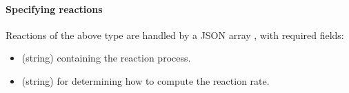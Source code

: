 \documentclass[letterpaper,10pt,english]{sphinxmanual}
\begin{document}
\paragraph{Specifying reactions}
\label{\detokenize{Applications/CdrPlasmaModel:specifying-reactions}}
Reactions of the above type are handled by a JSON array , with required fields:
\begin{itemize}
\item {} 
 (string) containing the reaction process.

\item {} 
 (string) for determining how to compute the reaction rate.

\end{itemize}

\begin{sphinxVerbatim}[commandchars=\\\{\},formatcom=\scriptsize]
  \PYG{p}{[}
       
       
       
  \PYG{p}{]}
\end{sphinxVerbatim}
\end{document}
